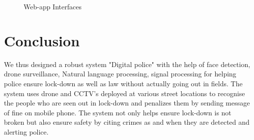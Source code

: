 \documentclass[10pt,twocolumn,letterpaper]{article}
\begin{document}
 \begin{figure}
   \centering
{} 
 
     \hfill
    \caption{Web-app Interfaces}
  
\end{figure}


\section{Conclusion}
We thus designed a robust system "Digital police" with the help of face detection, drone surveillance, Natural language processing, signal processing for helping police ensure lock-down as well as law without actually going out in fields. The system uses drone and CCTV's deployed at various street locations to recognise the people who are seen out in lock-down and penalizes them by sending message of fine on mobile phone. The system not only helps ensure lock-down is not broken but also ensure safety by citing crimes as and when they are detected and alerting police. 



{\small


}
\end{document}
